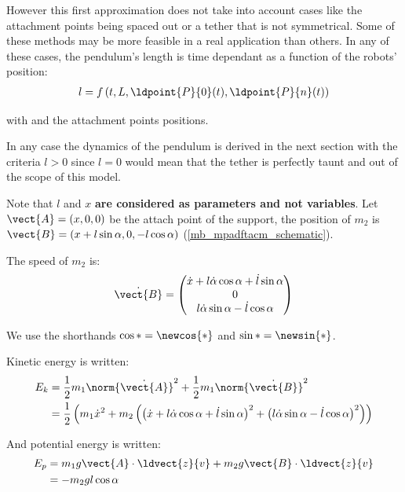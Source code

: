 However this first approximation does not take into account cases like the attachment points being
spaced out or a tether that is not symmetrical. Some of these methods may be more feasible in a
real application than others. In any of these cases, the pendulum's length is time dependant as a
function of the robots' position:
\begin{align}
	l = f\left(t, L, \ldpoint{P}{0}(t), \ldpoint{P}{n}(t)\right)
\end{align}

with  and  the attachment points positions.

In any case the dynamics of the pendulum is derived in the next section with the criteria $l>0$
since $l=0$ would mean that the tether is perfectly taunt and out of the scope of this model.

Note that $l$ and $x$ \textbf{are considered as parameters and not variables}. Let $\vect{A} =
	\left(x, 0, 0\right)$ be the attach point of the support, the position of $m_2$ is $\vect{B} =
	\left(x + l \sin{\alpha}, 0, -l \cos{\alpha}\right)$ (\cref{mb_mpadftacm_schematic}).

The speed of $m_2$ is:
\begin{align}
	\dot{\vect{B}} =
	\begin{pmatrix}
		\dot{x} + l \dot{\alpha}\cos{\alpha} + \dot{l}\sin{\alpha} \\
		0                                                          \\
		l \dot{\alpha}\sin{\alpha} - \dot{l}\cos{\alpha}
	\end{pmatrix}
\end{align}

We use the shorthands $\cos{\ast} = \newcos{\ast}$ and $\sin{\ast} = \newsin{\ast}$. \trigsh{}

Kinetic energy is written:
\begin{align}
	E_k & = \frac{1}{2} m_1 \norm{\dot{\vect{A}}}^2 + \frac{1}{2} m_1 \norm{\dot{\vect{B}}}^2 \nonumber                                                                                                              \\
	    & =\frac{1}{2}  \left(m_1 \dot{x}^2 + m_2 \left(\left(\dot{x} + l \dot{\alpha}\cos{\alpha} + \dot{l}\sin{\alpha} \right)^2 + \left(l \dot{\alpha}\sin{\alpha} - \dot{l} \cos{\alpha}\right)^2\right) \right)
\end{align}

And potential energy is written:
\begin{align}
	E_p & = m_1 g \vect{A}\cdot\ldvect{z}{v} + m_2 g \vect{B}\cdot\ldvect{z}{v} \nonumber \\
	    & = - m_2gl\cos{\alpha}
\end{align}

